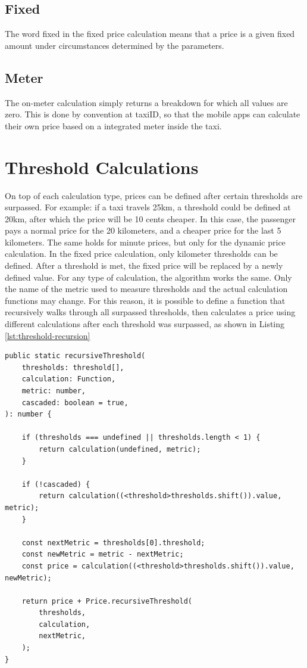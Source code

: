 \subsection{Fixed}
The word fixed in the fixed price calculation means that a price is a given fixed amount under circumstances determined by the parameters.
\subsection{Meter}
The on-meter calculation simply returns a breakdown for which all values are zero. This is done by convention at taxiID, so that the mobile apps can calculate their own price based on a integrated meter inside the taxi.


\section{Threshold Calculations}
On top of each calculation type, prices can be defined after certain thresholds are surpassed. For example: if a taxi travels 25km, a threshold could be defined at 20km, after which the price will be 10 cents cheaper. In this case, the passenger pays a normal price for the 20 kilometers, and a cheaper price for the last 5 kilometers. The same holds for minute prices, but only for the dynamic price calculation. In the fixed price calculation, only kilometer thresholds can be defined. After a threshold is met, the fixed price will be replaced by a newly defined value. For any type of calculation, the algorithm works the same. Only the name of the metric used to measure thresholds and the actual calculation functions may change. For this reason, it is possible to define a function that recursively walks through all surpassed thresholds, then calculates a price using different calculations after each threshold was surpassed, as shown in Listing \ref{lst:threshold-recursion}

\begin{lstlisting}[caption={Recursive threshold calculation.}, label={lst:threshold-recursion}]
public static recursiveThreshold(
	thresholds: threshold[],
	calculation: Function,
	metric: number,
	cascaded: boolean = true,
): number {

	if (thresholds === undefined || thresholds.length < 1) {
		return calculation(undefined, metric);
	}

	if (!cascaded) {
		return calculation((<threshold>thresholds.shift()).value, metric);
	}

	const nextMetric = thresholds[0].threshold;
	const newMetric = metric - nextMetric;
	const price = calculation((<threshold>thresholds.shift()).value, newMetric);

	return price + Price.recursiveThreshold(
		thresholds,
		calculation,
		nextMetric,
	);
}
\end{lstlisting}

